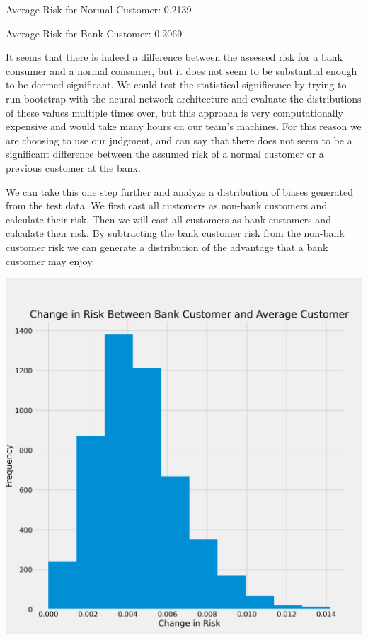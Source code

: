 \documentclass[12pt]{article}
\begin{document}
	Average Risk for Normal Customer: 0.2139 
	
	Average Risk for Bank Customer: 0.2069
	
	It seems that there is indeed a difference between the assessed risk for a bank consumer and a normal consumer, but it does not seem to be substantial enough to be deemed significant. We could test the statistical significance by trying to run bootstrap with the neural network architecture and evaluate the distributions of these values multiple times over, but this approach is very computationally expensive and would take many hours on our team's machines. For this reason we are choosing to use our judgment, and can say that there does not seem to be a significant difference between the assumed risk of a normal customer or a previous customer at the bank. 
	
	We can take this one step further and analyze a distribution of biases generated from the test data. We first cast all customers as non-bank customers and calculate their risk. Then we will cast all customers as bank customers and calculate their risk. By subtracting the bank customer risk from the non-bank customer risk we can generate a distribution of the advantage that a bank customer may enjoy. 
	
	\begin{center}
		\includegraphics[scale = 0.4]{../notebooks/customer_bias.png}
	\end{center}
\end{document}
